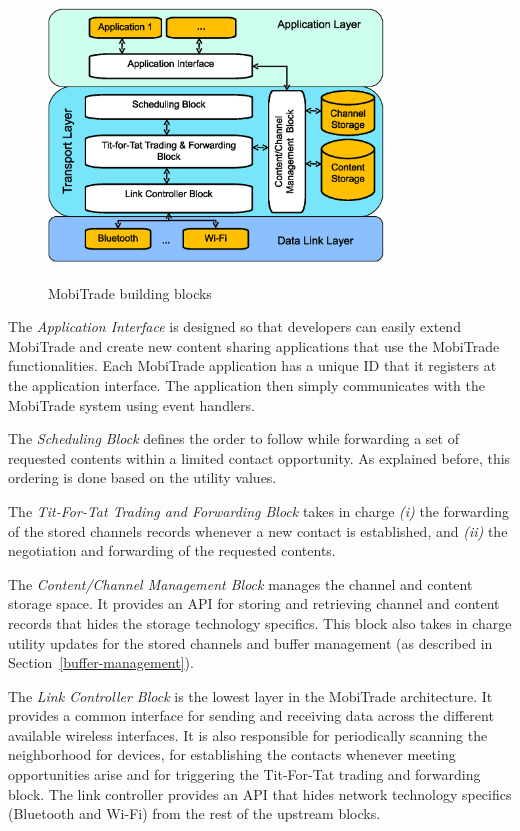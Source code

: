 \begin{figure}
\centering
\includegraphics[width=3.5in,height=3in]{Chapitre5/MobiTrade_Node.eps}
\vspace{-0.1in}
\caption{MobiTrade building blocks}
\label{MobiTrade-node-architecture}
\vspace{-0.1in}
\end{figure}

The \textit{Application Interface} is designed so that developers can easily extend MobiTrade and create new content sharing applications that use the MobiTrade functionalities. Each MobiTrade application has a unique ID that it registers at the application interface. The application then simply communicates with the MobiTrade system using event handlers.

The \textit{Scheduling Block} defines the order to follow while forwarding a set of requested contents within a limited contact opportunity. As explained before, this ordering is done based on the utility values.

The \textit{Tit-For-Tat Trading and Forwarding Block} takes in charge \emph{(i)} the forwarding of the stored channels records whenever a new contact is established, and \emph{(ii)} the negotiation and forwarding of the requested contents.

The \textit{Content/Channel Management Block} manages the channel and content storage space. It provides an API for storing and retrieving channel and content records that hides the storage technology specifics. This block also takes in charge utility updates for the stored channels and buffer management (as described in Section~\ref{buffer-management}).

The \textit{Link Controller Block} is the lowest layer in the MobiTrade architecture. It provides a common interface for sending and receiving data across the different available wireless interfaces. It is also responsible for periodically scanning the neighborhood for devices, for establishing the contacts whenever meeting opportunities arise and for triggering the Tit-For-Tat trading and forwarding block. The link controller provides an API that hides network technology specifics (Bluetooth and Wi-Fi) from the rest of the upstream blocks.

